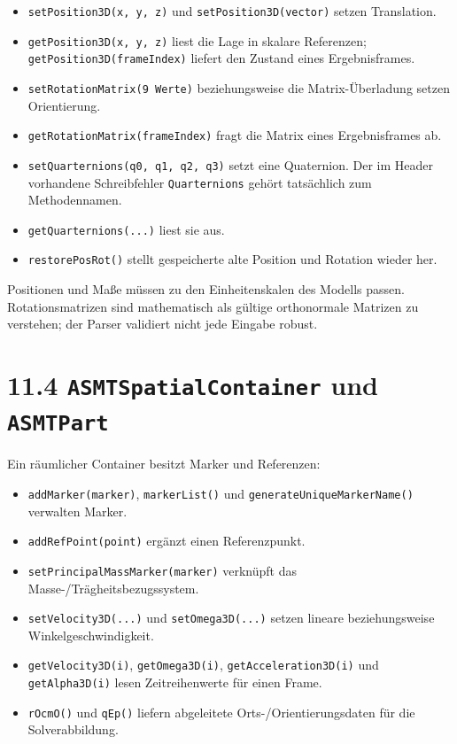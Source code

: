 \documentclass[
  12pt
]{book}
\providecommand{\tightlist}{%
  \setlength{\itemsep}{0pt}\setlength{\parskip}{0pt}}
\begin{document}
\begin{itemize}
\tightlist
\item
  \texttt{setPosition3D(x,\ y,\ z)} und \texttt{setPosition3D(vector)}
  setzen Translation.
\item
  \texttt{getPosition3D(x,\ y,\ z)} liest die Lage in skalare
  Referenzen; \texttt{getPosition3D(frameIndex)} liefert den Zustand
  eines Ergebnisframes.
\item
  \texttt{setRotationMatrix(9\ Werte)} beziehungsweise die
  Matrix-Überladung setzen Orientierung.
\item
  \texttt{getRotationMatrix(frameIndex)} fragt die Matrix eines
  Ergebnisframes ab.
\item
  \texttt{setQuarternions(q0,\ q1,\ q2,\ q3)} setzt eine Quaternion. Der
  im Header vorhandene Schreibfehler \texttt{Quarternions} gehört
  tatsächlich zum Methodennamen.
\item
  \texttt{getQuarternions(...)} liest sie aus.
\item
  \texttt{restorePosRot()} stellt gespeicherte alte Position und
  Rotation wieder her.
\end{itemize}

Positionen und Maße müssen zu den Einheitenskalen des Modells passen.
Rotationsmatrizen sind mathematisch als gültige orthonormale Matrizen zu
verstehen; der Parser validiert nicht jede Eingabe robust.

\hypertarget{asmtspatialcontainer-und-asmtpart}{%
\section{\texorpdfstring{{11.4} \texttt{ASMTSpatialContainer} und
\texttt{ASMTPart}}{11.4 ASMTSpatialContainer und ASMTPart}}\label{asmtspatialcontainer-und-asmtpart}}

Ein räumlicher Container besitzt Marker und Referenzen:

\begin{itemize}
\tightlist
\item
  \texttt{addMarker(marker)}, \texttt{markerList()} und
  \texttt{generateUniqueMarkerName()} verwalten Marker.
\item
  \texttt{addRefPoint(point)} ergänzt einen Referenzpunkt.
\item
  \texttt{setPrincipalMassMarker(marker)} verknüpft das
  Masse-/Trägheitsbezugssystem.
\item
  \texttt{setVelocity3D(...)} und \texttt{setOmega3D(...)} setzen
  lineare beziehungsweise Winkelgeschwindigkeit.
\item
  \texttt{getVelocity3D(i)}, \texttt{getOmega3D(i)},
  \texttt{getAcceleration3D(i)} und \texttt{getAlpha3D(i)} lesen
  Zeitreihenwerte für einen Frame.
\item
  \texttt{rOcmO()} und \texttt{qEp()} liefern abgeleitete
  Orts-/Orientierungsdaten für die Solverabbildung.
\end{itemize}
\end{document}
